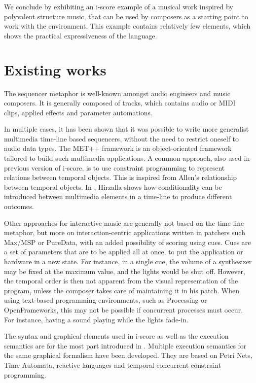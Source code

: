 \documentclass{article}
\begin{document}
We conclude by exhibiting an i-score example of a musical work inspired by polyvalent structure music,
that can be used by composers as a starting point to work with the environment. 
This example contains relatively few elements, which shows the practical expressiveness of the language.

\section{Existing works}
The sequencer metaphor is well-known amongst audio engineers and music composers. 
It is generally composed of tracks, which contains audio or MIDI clips, applied effects 
and parameter automations.

In multiple cases, it has been shown that it was possible to write 
more generalist multimedia time-line based sequencers, without the need to restrict oneself 
to audio data types. 
The MET++ framework\cite{ackermann1994direct} is an object-oriented framework 
tailored to build such multimedia applications.
A common approach, also used in previous version of i-score, is to use constraint programming 
to represent relations between temporal objects\cite{song1999interactive, allombert2006concurrent, toro2010concurrent}. 
This is inspired from Allen's relationship between temporal objects.
In \cite{hirzalla1995temporal}, Hirzalla shows how conditionality can be introduced between multimedia elements in a time-line to produce different outcomes.

Other approaches for interactive music are generally not based on the time-line metaphor, 
but more on interaction-centric applications written in patchers such Max/MSP or PureData, 
with an added possibility of scoring using cues. 
Cues are a set of parameters that are to be applied all at once, to put the application or hardware in a new state.
For instance, in a single cue, the volume of a synthesizer may be fixed at the maximum value, and the lights would be shut off.
However, the temporal order is then not apparent from the visual representation of the program, 
unless the composer takes care of maintaining it in his patch.
When using text-based programming environments, such as Processing or OpenFrameworks, this may not be possible if concurrent processes must occur. For instance, having a sound playing while the lights fade-in.

The syntax and graphical elements used in i-score as well as the 
execution semantics are for the most part introduced in \cite{celerier2015ossia, baltazar2014score}.
Multiple execution semantics for the same graphical formalism have been developed. 
They are based on Petri Nets\cite{allombert2007system}, Time Automata\cite{arias2015exploiting}, reactive languages\cite{arias2014executing} and temporal concurrent constraint programming\cite{toro2010model}.
\end{document}
